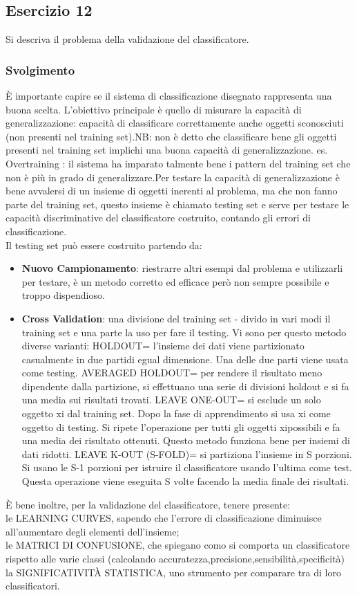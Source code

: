 \documentclass{article}
\begin{document}
\subsection*{Esercizio 12}
Si descriva il problema della validazione del classificatore.
\subsubsection*{Svolgimento}
È importante capire se il sistema di classificazione disegnato rappresenta una buona scelta. L’obiettivo principale è quello  di misurare la capacità di generalizzazione: capacità di classificare correttamente anche oggetti sconosciuti (non presenti nel training set).NB: non è detto che classificare bene gli oggetti presenti nel training set implichi una buona capacità di generalizzazione.
es. Overtraining : il sistema ha imparato talmente bene i pattern del training set che non è più in grado di generalizzare.Per testare la capacità di generalizzazione è bene avvalersi di un insieme di oggetti inerenti al problema, ma che non fanno parte del training set, questo insieme è chiamato testing set e serve per testare le capacità discriminative del classificatore costruito, contando gli errori di classificazione.\\
Il testing set può essere costruito partendo da:
\begin{itemize}
    \item \textbf{Nuovo Campionamento}: riestrarre altri esempi dal problema e utilizzarli per testare, è un metodo corretto ed efficace però non sempre possibile e troppo dispendioso.
    \item \textbf{Cross Validation}: una divisione del training set - divido in vari modi il training set e una parte la uso per 
    fare il testing. Vi sono per questo metodo diverse varianti:
        \subitem{-} HOLDOUT= l’insieme dei dati viene partizionato casualmente in due partidi egual dimensione. Una delle due parti viene usata come testing.
        \subitem{-} AVERAGED HOLDOUT= per rendere il risultato meno dipendente dalla partizione, si effettuano una serie di divisioni holdout e si fa una media sui risultati trovati.
        \subitem{-} LEAVE ONE-OUT= si esclude un solo oggetto xi dal training set. Dopo la fase di apprendimento si usa xi come oggetto di testing. Si ripete l’operazione per tutti gli oggetti xipossibili e fa una media dei risultato ottenuti. Questo metodo funziona bene per insiemi di dati ridotti.
        \subitem{-} LEAVE K-OUT (S-FOLD)= si partiziona l’insieme in S porzioni. Si usano le S-1 porzioni per istruire il classificatore usando l’ultima come test. Questa operazione viene eseguita S volte facendo la media finale dei risultati.
\end{itemize}
È bene inoltre, per la validazione del classificatore, tenere presente:\\
le LEARNING CURVES, sapendo che l’errore di classificazione diminuisce all’aumentare degli elementi dell’insieme;\\
le MATRICI DI CONFUSIONE, che spiegano como si comporta un classificatore rispetto alle varie classi (calcolando accuratezza,precisione,sensibilità,specificità)\\
la SIGNIFICATIVITÀ STATISTICA, uno strumento per comparare tra di loro classificatori.
\end{document}
